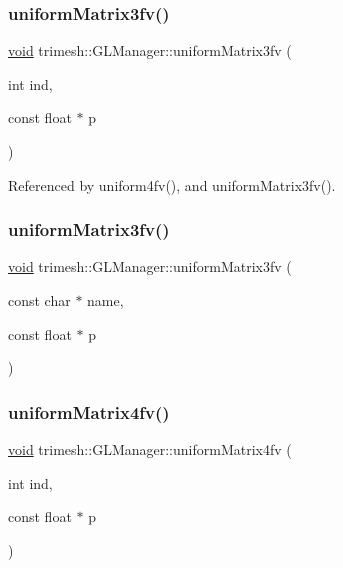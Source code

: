 \subsubsection{\texorpdfstring{uniform\+Matrix3fv()}{uniformMatrix3fv()}\hspace{0.1cm}{\footnotesize\ttfamily [1/2]}}
{\footnotesize\ttfamily \hyperlink{namespacetrimesh_a784ddfd979e1c579bda795a8edfc3f43}{void} trimesh\+::\+G\+L\+Manager\+::uniform\+Matrix3fv (\begin{DoxyParamCaption}\item[{int}]{ind,  }\item[{const float $\ast$}]{p }\end{DoxyParamCaption})}



Referenced by uniform4fv(), and uniform\+Matrix3fv().

\mbox{\label{classtrimesh_1_1GLManager_a8148eb6de9963331b5335fe4ff0f6b5b}} 
\subsubsection{\texorpdfstring{uniform\+Matrix3fv()}{uniformMatrix3fv()}\hspace{0.1cm}{\footnotesize\ttfamily [2/2]}}
{\footnotesize\ttfamily \hyperlink{namespacetrimesh_a784ddfd979e1c579bda795a8edfc3f43}{void} trimesh\+::\+G\+L\+Manager\+::uniform\+Matrix3fv (\begin{DoxyParamCaption}\item[{const char $\ast$}]{name,  }\item[{const float $\ast$}]{p }\end{DoxyParamCaption})\hspace{0.3cm}{\ttfamily [inline]}}

\mbox{\label{classtrimesh_1_1GLManager_a6246470796e83a3fdaad7f433f268d48}} 
\subsubsection{\texorpdfstring{uniform\+Matrix4fv()}{uniformMatrix4fv()}\hspace{0.1cm}{\footnotesize\ttfamily [1/2]}}
{\footnotesize\ttfamily \hyperlink{namespacetrimesh_a784ddfd979e1c579bda795a8edfc3f43}{void} trimesh\+::\+G\+L\+Manager\+::uniform\+Matrix4fv (\begin{DoxyParamCaption}\item[{int}]{ind,  }\item[{const float $\ast$}]{p }\end{DoxyParamCaption})}



